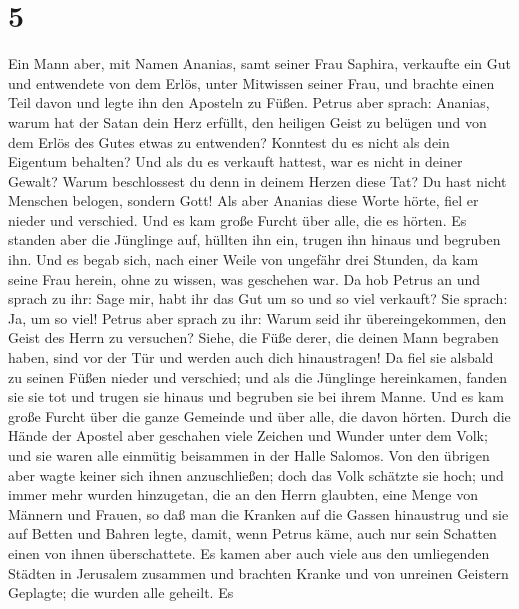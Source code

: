 \hypertarget{section-4}{%
\section{5}\label{section-4}}

 Ein Mann aber, mit Namen Ananias, samt seiner Frau
Saphira, verkaufte ein Gut  und entwendete von dem Erlös,
unter Mitwissen seiner Frau, und brachte einen Teil davon und legte ihn
den Aposteln zu Füßen.  Petrus aber sprach: Ananias, warum
hat der Satan dein Herz erfüllt, den heiligen Geist zu belügen und von
dem Erlös des Gutes etwas zu entwenden?  Konntest du es
nicht als dein Eigentum behalten? Und als du es verkauft hattest, war es
nicht in deiner Gewalt? Warum beschlossest du denn in deinem Herzen
diese Tat? Du hast nicht Menschen belogen, sondern Gott! 
Als aber Ananias diese Worte hörte, fiel er nieder und verschied. Und es
kam große Furcht über alle, die es hörten.  Es standen
aber die Jünglinge auf, hüllten ihn ein, trugen ihn hinaus und begruben
ihn.  Und es begab sich, nach einer Weile von ungefähr
drei Stunden, da kam seine Frau herein, ohne zu wissen, was geschehen
war.  Da hob Petrus an und sprach zu ihr: Sage mir, habt
ihr das Gut um so und so viel verkauft? Sie sprach: Ja, um so viel!
 Petrus aber sprach zu ihr: Warum seid ihr
übereingekommen, den Geist des Herrn zu versuchen? Siehe, die Füße
derer, die deinen Mann begraben haben, sind vor der Tür und werden auch
dich hinaustragen!  Da fiel sie alsbald zu seinen Füßen
nieder und verschied; und als die Jünglinge hereinkamen, fanden sie sie
tot und trugen sie hinaus und begruben sie bei ihrem Manne.
 Und es kam große Furcht über die ganze Gemeinde und über
alle, die davon hörten.  Durch die Hände der Apostel aber
geschahen viele Zeichen und Wunder unter dem Volk; und sie waren alle
einmütig beisammen in der Halle Salomos.  Von den übrigen
aber wagte keiner sich ihnen anzuschließen; doch das Volk schätzte sie
hoch;  und immer mehr wurden hinzugetan, die an den Herrn
glaubten, eine Menge von Männern und Frauen,  so daß man
die Kranken auf die Gassen hinaustrug und sie auf Betten und Bahren
legte, damit, wenn Petrus käme, auch nur sein Schatten einen von ihnen
überschattete.  Es kamen aber auch viele aus den
umliegenden Städten in Jerusalem zusammen und brachten Kranke und von
unreinen Geistern Geplagte; die wurden alle geheilt.  Es
